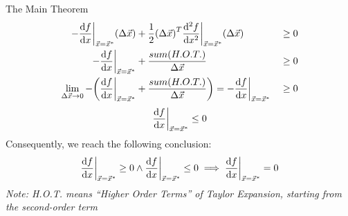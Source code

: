 \begin{ln-theorem}{The Main Theorem}{}
\begin{align*}
        - \dv{f}{x} \bigg|_{\vec{x} = \vec{x}^*} (\Delta \vec{x}) &+ \frac{1}{2} {(\Delta \vec{x})}^T \dv[2]{f}{x} \bigg|_{\vec{x} = \vec{x}^*} (\Delta \vec{x}) &&\geq 0 \\
        - \dv{f}{x} \bigg|_{\vec{x} = \vec{x}^*} &+ \frac{sum(H.O.T.)}{\Delta \vec{x}} &&\geq 0 \\
        \lim_{\Delta \vec{x} \rightarrow 0} - \bigg( \dv{f}{x} \bigg|_{\vec{x} = \vec{x}^*} &+ \frac{sum(H.O.T.)}{\Delta \vec{x}} \bigg) = - \dv{f}{x} \bigg|_{\vec{x} = \vec{x}^*} &&\geq 0 \\
    \end{align*}
    \[
        \dv{f}{x} \bigg|_{\vec{x} = \vec{x}^*} \leq 0
    \]
    Consequently, we reach the following conclusion:
    \[
        \dv{f}{x} \bigg|_{\vec{x} = \vec{x}^*} \geq 0 \land \dv{f}{x} \bigg|_{\vec{x} = \vec{x}^*} \leq 0 \implies \dv{f}{x} \bigg|_{\vec{x} = \vec{x}^*} = 0 
    \]
    \textit{Note: H.O.T. means ``Higher Order Terms'' of Taylor Expansion, starting from the second-order term}
\end{ln-theorem}

